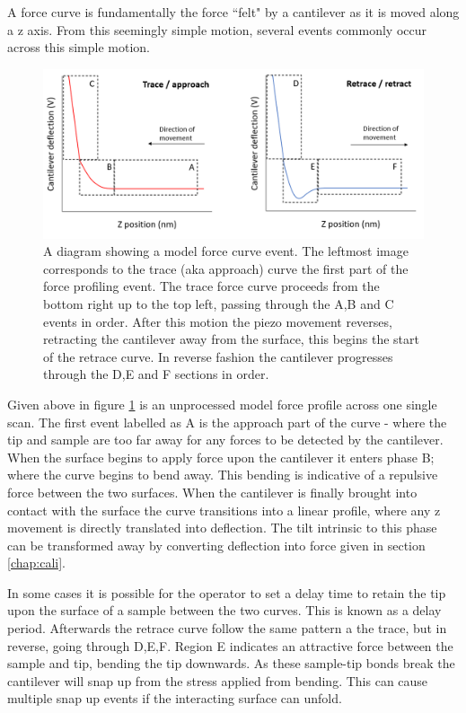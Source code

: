 A force curve is fundamentally the force ``felt" by a cantilever as it is moved along a z axis. From this seemingly simple motion, several events commonly occur across this simple motion. 

\begin{figure}[h!]     %
        \begin{center}
          \includegraphics[width=140mm]{chapter2/forceCurveAnatomy.PNG}
\end{center}
\caption{A diagram showing a model force curve event. The leftmost image corresponds to the trace (aka approach) curve the first part of the force profiling event. The trace force curve proceeds from the bottom right up to the top left, passing through the A,B and C events in order. After this motion the piezo movement reverses, retracting the cantilever away from the surface, this begins the start of the retrace curve. In reverse fashion the cantilever progresses through the D,E and F sections in order.}
\label{fig:forceAnatomy}                 %
\end{figure}

Given above in figure \ref{fig:forceAnatomy} is an unprocessed model force profile across one single scan. The first event labelled as A is the approach part of the curve - where the tip and sample are too far away for any forces to be detected by the cantilever. When the surface begins to apply force upon the cantilever it enters phase B; where the curve begins to bend away. This bending is indicative of a repulsive force between the two surfaces. When the cantilever is finally brought into contact with the surface the curve transitions into a linear profile, where any z movement is directly translated into deflection. The tilt intrinsic to this phase can be transformed away by converting deflection into force given in section \ref{chap:cali}.

In some cases it is possible for the operator to set a delay time to retain the tip upon the surface of a sample between the two curves. This is known as a delay period. Afterwards the retrace curve follow the same pattern a the trace, but in reverse, going through D,E,F. Region E indicates an attractive force between the sample and tip, bending the tip downwards. As these sample-tip bonds break the cantilever will snap up from the stress applied from bending. This can cause multiple snap up events if the interacting surface can unfold.

